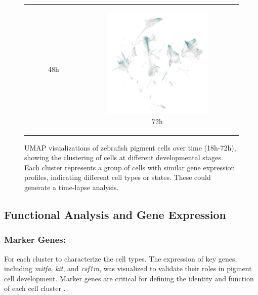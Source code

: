 \documentclass[runningheads]{llncs}
\begin{document}
\begin{figure}[H]
{\begin{tabular}{ccc}
\begin{subfigure}[b]{0.3\textwidth}
        \caption{48h}
        \label{fig:umap_48h}
      \end{subfigure} &
      \begin{subfigure}[b]{0.3\textwidth}
        \centering
        \includegraphics[width=\textwidth]{fig_umap_72h_optimized.png}
        \caption{72h}
        \label{fig:umap_72h}
      \end{subfigure}
    \end{tabular}%
  }
  \caption{UMAP visualizations of zebrafish pigment cells over time (18h-72h), showing the clustering of cells at different developmental stages. Each cluster represents a group of cells with similar gene expression profiles, indicating different cell types or states. These could generate a time-lapse analysis.}
  \label{fig:umap_all}
\end{figure}

\subsection*{Functional Analysis and Gene Expression}
\subsubsection{Marker Genes:} For each cluster to characterize the cell types. The expression of key genes, including \textit{mitfa}, \textit{kit}, and \textit{csf1ra}, was visualized to validate their roles in pigment cell development. Marker genes are critical for defining the identity and function of each cell cluster \cite{howard2021atlas}.
\end{document}
